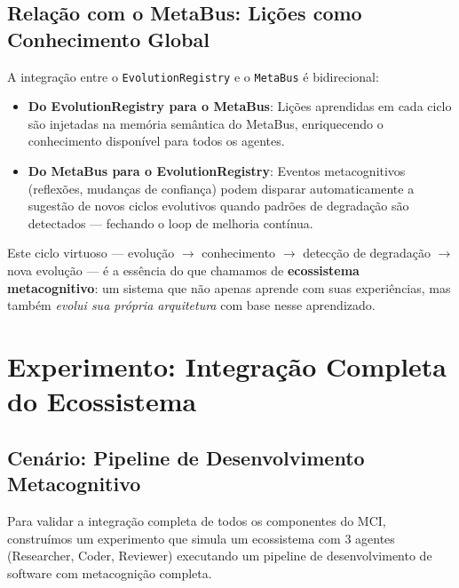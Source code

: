 \subsection{Relação com o MetaBus: Lições como Conhecimento Global}

A integração entre o \texttt{EvolutionRegistry} e o \texttt{MetaBus} é bidirecional:

\begin{itemize}
    \item \textbf{Do EvolutionRegistry para o MetaBus}: Lições aprendidas em cada ciclo são injetadas na memória semântica do MetaBus, enriquecendo o conhecimento disponível para todos os agentes.
    \item \textbf{Do MetaBus para o EvolutionRegistry}: Eventos metacognitivos (reflexões, mudanças de confiança) podem disparar automaticamente a sugestão de novos ciclos evolutivos quando padrões de degradação são detectados — fechando o loop de melhoria contínua.
\end{itemize}

Este ciclo virtuoso — evolução $\rightarrow$ conhecimento $\rightarrow$ detecção de degradação $\rightarrow$ nova evolução — é a essência do que chamamos de \textbf{ecossistema metacognitivo}: um sistema que não apenas aprende com suas experiências, mas também \textit{evolui sua própria arquitetura} com base nesse aprendizado.

\section{Experimento: Integração Completa do Ecossistema}
\label{sec:experiment}

\subsection{Cenário: Pipeline de Desenvolvimento Metacognitivo}

Para validar a integração completa de todos os componentes do MCI, construímos um experimento que simula um ecossistema com 3 agentes (Researcher, Coder, Reviewer) executando um pipeline de desenvolvimento de software com metacognição completa.


